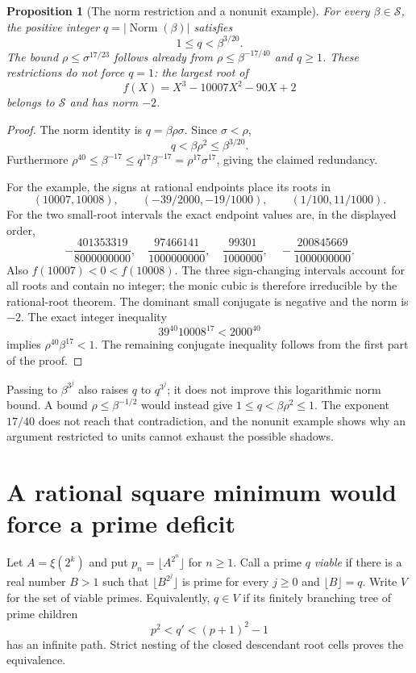 \documentclass[11pt,a4paper]{article}
\newtheorem{proposition}[theorem]{Proposition}
\theoremstyle{definition}
\theoremstyle{remark}
\numberwithin{equation}{section}
\begin{document}
\begin{proposition}[The norm restriction and a nonunit example]
\label{ft:prop:nonunit}
For every $\beta\in\mathcal S$, the positive integer
$q=|\operatorname{Norm}(\beta)|$ satisfies
\[
 1\le q<\beta^{3/20}.
\]
The bound $\rho\le\sigma^{17/23}$ follows already from
$\rho\le\beta^{-17/40}$ and $q\ge1$. These restrictions do not force
$q=1$: the largest root of
\[
 f(X)=X^3-10007X^2-90X+2
\]
belongs to $\mathcal S$ and has norm $-2$.
\end{proposition}
\begin{proof}
The norm identity is $q=\beta\rho\sigma$. Since $\sigma<\rho$,
\[
 q<\beta\rho^2\le\beta^{3/20}.
\]
Furthermore
$\rho^{40}\le\beta^{-17}\le q^{17}\beta^{-17}
=\rho^{17}\sigma^{17}$, giving the claimed redundancy.

For the example, the signs at rational endpoints place its roots in
\[
 (10007,10008),\qquad
 (-39/2000,-19/1000),\qquad(1/100,11/1000).
\]
For the two small-root intervals the exact endpoint values are,
in the displayed order,
\[
 -\frac{401353319}{8000000000},\quad
 \frac{97466141}{1000000000},\quad
 \frac{99301}{1000000},\quad
 -\frac{200845669}{1000000000}.
\]
Also $f(10007)<0<f(10008)$. The three sign-changing intervals account
for all roots and contain no integer; the monic cubic is therefore
irreducible by the rational-root theorem. The dominant small conjugate
is negative and the norm is $-2$. The exact integer inequality
\[
 39^{40}10008^{17}<2000^{40}
\]
implies $\rho^{40}\beta^{17}<1$. The remaining conjugate inequality
follows from the first part of the proof.
\end{proof}

Passing to $\beta^{3^j}$ also raises $q$ to $q^{3^j}$; it does not
improve this logarithmic norm bound. A bound
$\rho\le\beta^{-1/2}$ would instead give
$1\le q<\beta\rho^2\le1$. The exponent $17/40$ does not reach that
contradiction, and the nonunit example shows why an argument restricted
to units cannot exhaust the possible shadows.

\section{A rational square minimum would force a prime deficit}
\label{ft:sec:square-deficit}

Let $A=\xi(2^k)$ and put $p_n=\lfloor A^{2^n}\rfloor$ for $n\ge1$.
Call a prime $q$ \emph{viable} if there is a real number $B>1$ such
that $\lfloor B^{2^j}\rfloor$ is prime for every $j\ge0$ and
$\lfloor B\rfloor=q$. Write $V$ for the set of viable primes.
Equivalently, $q\in V$ if its finitely branching tree of prime children
\[
 p^2<q'<(p+1)^2-1
\]
has an infinite path. Strict nesting of the closed descendant root
cells proves the equivalence.
\end{document}
